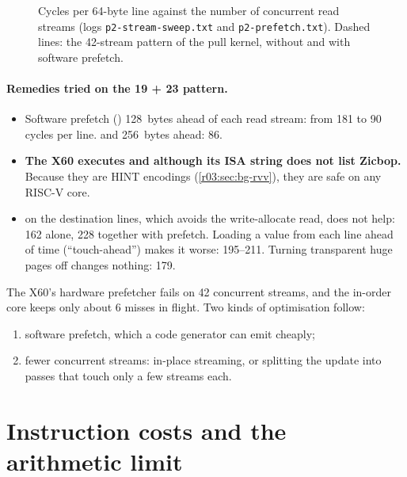 \begin{figure}[htbp]
  \centering
  
  \caption[Cost of concurrent streams on the X60]{Cycles per 64-byte line against the number
    of concurrent read streams (logs \texttt{p2-stream-sweep.txt} and
    \texttt{p2-prefetch.txt}). Dashed lines: the 42-stream pattern of the pull kernel, without
    and with software prefetch.}\label{r03:fig:streams}
\end{figure}

\paragraph{Remedies tried on the 19 + 23 pattern.}
\begin{itemize}
  \item Software prefetch () 128~bytes ahead of each read stream: from 181 to
        90 cycles per line.  and  256~bytes ahead: 86.
  \item \textbf{The X60 executes  and  although its ISA
        string does not list Zicbop.} Because they are HINT encodings
        (\cref{r03:sec:bg-rvv}), they are safe on any RISC-V core.
  \item {} on the destination lines, which avoids the write-allocate read, does
        not help: 162 alone, 228 together with prefetch. Loading a value from each line ahead
        of time (``touch-ahead'') makes it worse: 195--211. Turning transparent huge pages off
        changes nothing: 179.
\end{itemize}

\begin{keyidea}
The X60's hardware prefetcher fails on 42 concurrent streams, and the in-order core keeps only
about 6 misses in flight. Two kinds of optimisation follow:
\begin{enumerate}[label=(\alph*)]
  \item software prefetch, which a code generator can emit cheaply;
  \item fewer concurrent streams: in-place streaming, or splitting the update into passes that
        touch only a few streams each.
\end{enumerate}
\end{keyidea}

\section{Instruction costs and the arithmetic limit}\label{r03:sec:ops}

